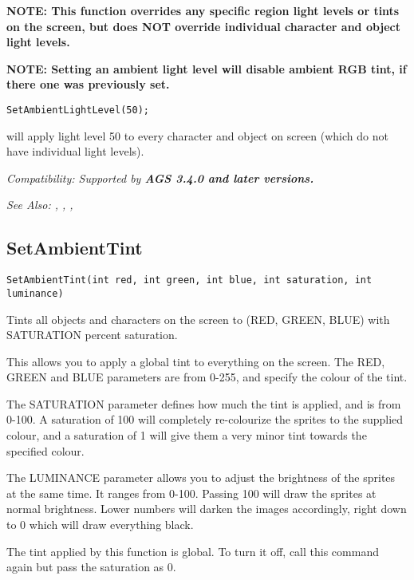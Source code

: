 \bf{NOTE:} This function overrides any specific region light levels or tints on the screen,
but does NOT override individual character and object light levels.

\bf{NOTE}: Setting an ambient light level will disable ambient RGB tint,
if there one was previously set.

\begin{verbatim}
SetAmbientLightLevel(50);
\end{verbatim}
will apply light level 50 to every character and object on screen (which do not have individual light levels).

\it{Compatibility:} Supported by \bf{AGS 3.4.0} and later versions.

\it{See Also:} ,
,
,


\subsection{SetAmbientTint}\label{SetAmbientTint}%

\begin{verbatim}
SetAmbientTint(int red, int green, int blue, int saturation, int luminance)
\end{verbatim}

Tints all objects and characters on the screen to (RED, GREEN, BLUE) with SATURATION percent
saturation.

This allows you to apply a global tint to everything on the screen. The RED, GREEN and BLUE
parameters are from 0-255, and specify the colour of the tint.

The SATURATION parameter defines how much the tint is applied, and is from 0-100. A
saturation of 100 will completely re-colourize the sprites to the supplied colour, and a
saturation of 1 will give them a very minor tint towards the specified colour.

The LUMINANCE parameter allows you to adjust the brightness of the sprites at the same time.
It ranges from 0-100. Passing 100 will draw the sprites at normal brightness. Lower
numbers will darken the images accordingly, right down to 0 which will draw everything black.

The tint applied by this function is global. To turn it off, call this command again but
pass the saturation as 0.

